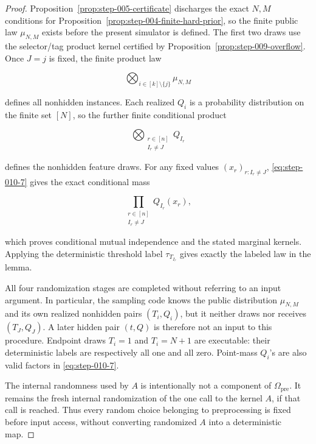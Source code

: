 \begin{proof}
Proposition~\ref{prop:step-005-certificate} discharges the exact
\(N,M\) conditions for Proposition~\ref{prop:step-004-finite-hard-prior}, so the finite public law
\(\mu_{N,M}\) exists before the present simulator is defined. The first two
draws use the selector/tag product kernel certified by Proposition~\ref{prop:step-009-overflow}. Once \(J=j\) is fixed, the finite
product law

\[
  \bigotimes_{i\in[k]\setminus\{j\}}\mu_{N,M}
\]

defines all nonhidden instances. Each realized \(Q_i\) is a probability
distribution on the finite set \([N]\), so the further finite conditional
product

\[
  \bigotimes_{\substack{r\in[n]\\ I_r\ne J}}Q_{I_r}
\tag{S10.7}\label{eq:step-010-7}
\]

defines the nonhidden feature draws. For any fixed values
\((x_r)_{r:I_r\ne J}\), \eqref{eq:step-010-7} gives the exact conditional mass

\[
  \prod_{\substack{r\in[n]\\ I_r\ne J}}Q_{I_r}(x_r),
\tag{S10.8}\label{eq:step-010-8}
\]

which proves conditional mutual independence and the stated marginal
kernels. Applying the deterministic threshold label
\(\tau_{T_{I_r}}\) gives exactly the labeled law in the lemma.

All four randomization stages are completed without referring to an input
argument. In particular, the sampling code knows the public distribution
\(\mu_{N,M}\) and its own realized nonhidden pairs
\((T_i,Q_i)\), but it neither draws nor receives \((T_J,Q_J)\).
A later hidden pair \((t,Q)\) is therefore not an input to this procedure.
Endpoint draws \(T_i=1\) and \(T_i=N+1\) are executable: their deterministic
labels are respectively all one and all zero. Point-mass \(Q_i\)'s are also
valid factors in \eqref{eq:step-010-7}.

The internal randomness used by \(A\) is intentionally not a component of
\(\Omega_{\mathrm{pre}}\). It remains the fresh internal randomization of
the one call to the kernel \(A\), if that call is reached. Thus every
random choice belonging to preprocessing is fixed before input access,
without converting randomized \(A\) into a deterministic map.
\end{proof}

